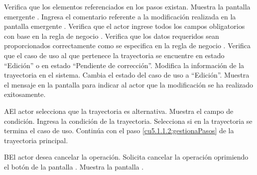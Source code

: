 \begin{UCtrayectoria}
	\UCpaso[\UCsist] Verifica que los elementos referenciados en los pasos existan. 
	\UCpaso[\UCsist] Muestra la pantalla emergente .
	\UCpaso[\UCsist] Ingresa el comentario referente a la modificación realizada en la pantalla emergente . \label{cu5.1.1.2:ingresaComentario}
    \UCpaso[\UCsist] Verifica que el actor ingrese todos los campos obligatorios con base en la regla de negocio  . 
    \UCpaso[\UCsist] Verifica que los datos requeridos sean proporcionados correctamente como se especifica en la regla de negocio . 
	\UCpaso[\UCsist] Verifica que el caso de uso al que pertenece la trayectoria se encuentre en estado ``Edición'' o en estado ``Pendiente de corrección''.
	\UCpaso[\UCsist] Modifica la información de la trayectoria en el sistema.
    \UCpaso[\UCsist] Cambia el estado del caso de uso a ``Edición''.
	\UCpaso[\UCsist] Muestra el mensaje  en la pantalla  
	para indicar al actor que la modificación se ha realizado exitosamente.
    
\end{UCtrayectoria}
 \begin{UCtrayectoriaA}{A}{El actor selecciona que la trayectoria es alternativa.}
    \UCpaso[\UCsist] Muestra el campo de condición.
    \UCpaso[\UCactor] Ingresa la condición de la trayectoria.
    \UCpaso[\UCactor] Selecciona si en la trayectoria se termina el caso de uso.
    \UCpaso[] Continúa con el paso \ref{cu5.1.1.2:gestionaPasos} de la trayectoria principal.
 \end{UCtrayectoriaA}
 \begin{UCtrayectoriaA}{B}{El actor desea cancelar la operación.}
    \UCpaso[\UCactor] Solicita cancelar la operación oprimiendo el botón  de la pantalla .
    \UCpaso[\UCsist] Muestra la pantalla .
 \end{UCtrayectoriaA}
 
